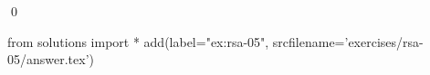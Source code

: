 
\begin{ex} 
  \label{ex:rsa-05}
  
  \qed
\end{ex} 
\begin{python0}
from solutions import *
add(label="ex:rsa-05",
    srcfilename='exercises/rsa-05/answer.tex') 
\end{python0}
